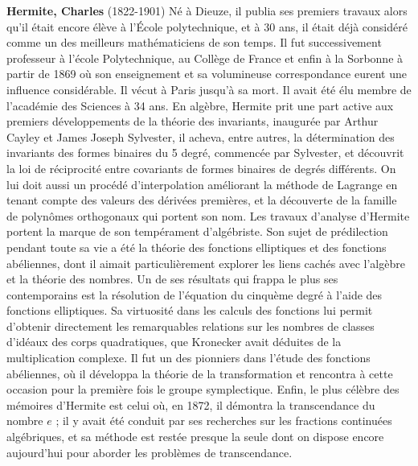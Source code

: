 \textbf{Hermite, Charles} (1822-1901) Né à Dieuze, il publia ses premiers travaux alors qu'il était encore élève à l'École polytechnique, et à 30 ans, il était déjà considéré comme un des meilleurs mathématiciens de son temps. Il fut successivement professeur à l'école Polytechnique, au Collège de France et enfin à la Sorbonne à partir de 1869 où son enseignement et sa volumineuse correspondance eurent une influence considérable. Il vécut à Paris jusqu'à sa mort. Il avait été élu membre de l'académie des Sciences à 34 ans. En algèbre, Hermite prit une part active aux premiers développements de la théorie des invariants, inaugurée par Arthur Cayley et James Joseph Sylvester, il acheva, entre autres, la détermination des invariants des formes binaires du 5 degré, commencée par Sylvester, et découvrit la loi de réciprocité entre covariants de formes binaires de degrés différents. On lui doit aussi un procédé d'interpolation améliorant la méthode de Lagrange en tenant compte des valeurs des dérivées premières, et la découverte de la famille de polynômes orthogonaux qui portent son nom. Les travaux d'analyse d'Hermite portent la marque de son tempérament d'algébriste. Son sujet de prédilection pendant toute sa vie a été la théorie des fonctions elliptiques et des fonctions abéliennes, dont il aimait particulièrement explorer les liens cachés avec l'algèbre et la théorie des nombres. Un de ses résultats qui frappa le plus ses contemporains est la résolution de l'équation du cinquème degré à l'aide des fonctions elliptiques. Sa virtuosité dans les calculs des fonctions lui permit d'obtenir directement les remarquables relations sur les nombres de classes d'idéaux des corps quadratiques, que Kronecker avait déduites de la multiplication complexe. Il fut un des pionniers dans l'étude des fonctions abéliennes, où il développa la théorie de la transformation et rencontra à cette occasion pour la première fois le groupe symplectique. Enfin, le plus célèbre des mémoires d'Hermite est celui où, en 1872, il démontra la transcendance du nombre $e$ ; il y avait été conduit par ses recherches sur les fractions continuées algébriques, et sa méthode est restée presque la seule dont on dispose encore aujourd'hui pour aborder les problèmes de transcendance.

